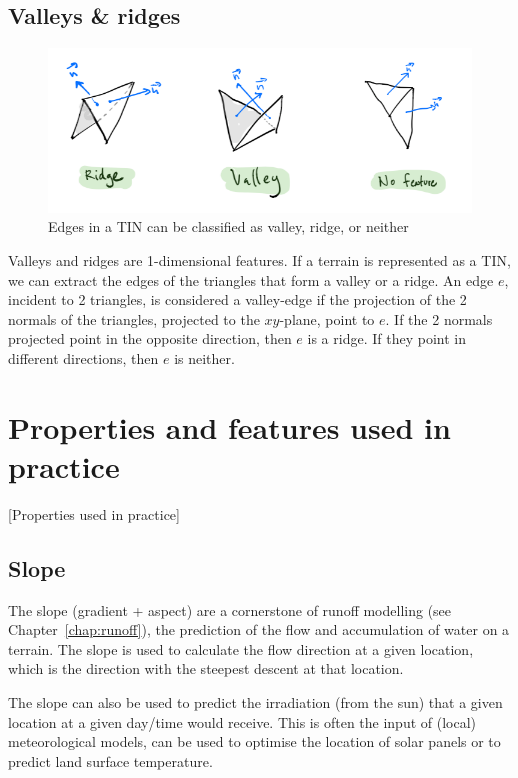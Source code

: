 \subsection{Valleys \& ridges}

\begin{figure}
  \centering
  \includegraphics[width=\linewidth]{figs/valley_ridge}
  \caption{Edges in a TIN can be classified as valley, ridge, or neither}%
\label{fig:valley_ridge}
\end{figure}
Valleys and ridges are 1-dimensional features.
If a terrain is represented as a TIN, we can extract the edges of the triangles that form a valley or a ridge.
An edge $e$, incident to 2 triangles, is considered a valley-edge if the projection of the 2 normals of the triangles, projected to the $xy$-plane, point to $e$.
If the 2 normals projected point in the opposite direction, then $e$ is a ridge.
If they point in different directions, then $e$ is neither.



%
\section{Properties and features used in practice}[Properties used in practice]


\subsection{Slope}%

The slope (gradient + aspect) are a cornerstone of runoff modelling (see Chapter~\ref{chap:runoff}), the prediction of the flow and accumulation of water on a terrain.
The slope is used to calculate the flow direction at a given location, which is the direction with the steepest descent at that location.

%

The slope can also be used to predict the irradiation (from the sun) that a given location at a given day/time would receive.
This is often the input of (local) meteorological models, can be used to optimise the location of solar panels or to predict land surface temperature.


